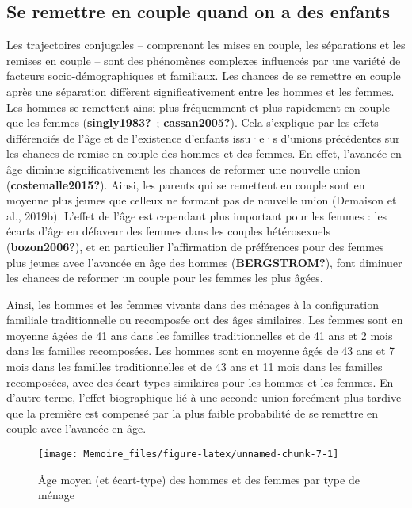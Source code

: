\documentclass[
  12pt,
]{book}
\begin{document}
\subsection{Se remettre en couple quand on a des
enfants}\label{se-remettre-en-couple-quand-on-a-des-enfants}

Les trajectoires conjugales -- comprenant les mises en couple, les
séparations et les remises en couple -- sont des phénomènes complexes
influencés par une variété de facteurs socio-démographiques et
familiaux. Les chances de se remettre en couple après une séparation
diffèrent significativement entre les hommes et les femmes. Les hommes
se remettent ainsi plus fréquemment et plus rapidement en couple que les
femmes (\textbf{singly1983?}~; \textbf{cassan2005?}). Cela s'explique
par les effets différenciés de l'âge et de l'existence d'enfants
issu·e·s d'unions précédentes sur les chances de remise en couple des
hommes et des femmes. En effet, l'avancée en âge diminue
significativement les chances de reformer une nouvelle union
(\textbf{costemalle2015?}). Ainsi, les parents qui se remettent en
couple sont en moyenne plus jeunes que celleux ne formant pas de
nouvelle union (Demaison et al., 2019b). L'effet de l'âge est cependant
plus important pour les femmes : les écarts d'âge en défaveur des femmes
dans les couples hétérosexuels (\textbf{bozon2006?}), et en particulier
l'affirmation de préférences pour des femmes plus jeunes avec l'avancée
en âge des hommes (\textbf{BERGSTROM?}), font diminuer les chances de
reformer un couple pour les femmes les plus âgées.

Ainsi, les hommes et les femmes vivants dans des ménages à la
configuration familiale traditionnelle ou recomposée ont des âges
similaires. Les femmes sont en moyenne âgées de 41 ans dans les familles
traditionnelles et de 41 ans et 2 mois dans les familles recomposées.
Les hommes sont en moyenne âgés de 43 ans et 7 mois dans les familles
traditionnelles et de 43 ans et 11 mois dans les familles recomposées,
avec des écart-types similaires pour les hommes et les femmes. En
d'autre terme, l'effet biographique lié à une seconde union forcément
plus tardive que la première est compensé par la plus faible probabilité
de se remettre en couple avec l'avancée en âge.

\begin{figure}[h]

{\centering \texttt{[image: Memoire\_files/figure-latex/unnamed-chunk-7-1]} 

}

\caption{Âge moyen (et écart-type) des hommes et des femmes par type de ménage}\label{fig:unnamed-chunk-7}
\end{figure}
\end{document}
